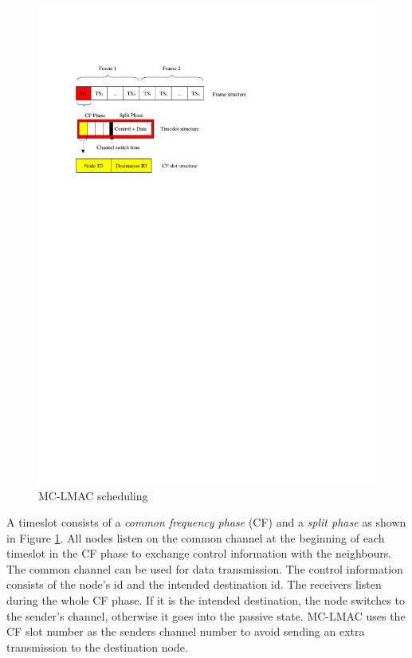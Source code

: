 \begin{figure}
\centering
\includegraphics[trim=2cm 19cm 8cm 3cm, clip=true, totalheight=0.35\textheight]{mclmac.pdf}
\caption{MC-LMAC scheduling}
\label{fig_mclmac}
\end{figure}

A timeslot consists of a \textit{common frequency phase} (CF) and a \textit{split phase} as shown in Figure \ref{fig_mclmac}. All nodes listen on the common channel at the beginning of each timeslot in the CF phase to exchange control information with the neighbours. The common channel can be used for data transmission. The control information consists of the node's id and the intended destination id. The receivers listen during the whole CF phase. If it is the intended destination, the node switches to the sender's channel, otherwise it goes into the passive state. MC-LMAC uses the CF slot number as the senders channel number to avoid sending an extra transmission to the destination node.

